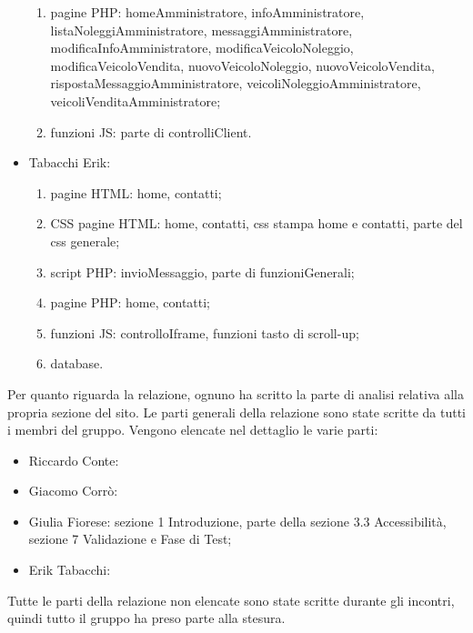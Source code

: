 \begin{itemize}
\begin{enumerate}
            \item pagine PHP: homeAmministratore, infoAmministratore, listaNoleggiAmministratore, messaggiAmministratore, modificaInfoAmministratore, modificaVeicoloNoleggio, modificaVeicoloVendita, nuovoVeicoloNoleggio, nuovoVeicoloVendita, rispostaMessaggioAmministratore, veicoliNoleggioAmministratore, veicoliVenditaAmministratore;
            \item funzioni JS: parte di controlliClient.
        \end{enumerate}
    \item Tabacchi Erik:
        \begin{enumerate}
            \item pagine HTML: home, contatti;
            \item CSS pagine HTML: home, contatti, css stampa home e contatti, parte del css generale;
            \item script PHP: invioMessaggio, parte di funzioniGenerali;
            \item pagine PHP: home, contatti;
            \item funzioni JS: controlloIframe, funzioni tasto di scroll-up;
            \item database.
        \end{enumerate}
\end{itemize}
Per quanto riguarda la relazione, ognuno ha scritto la parte di analisi relativa alla propria sezione del sito. Le parti generali della relazione sono state scritte da tutti i membri del gruppo.
Vengono elencate nel dettaglio le varie parti:
\begin{itemize}
    \item Riccardo Conte: 
    \item Giacomo Corrò: 
    \item Giulia Fiorese: sezione 1 Introduzione, parte della sezione 3.3 Accessibilità, sezione 7 Validazione e Fase di Test; 
    \item Erik Tabacchi:
\end{itemize}
Tutte le parti della relazione non elencate sono state scritte durante gli incontri, quindi tutto il gruppo ha preso parte alla stesura.
\pagebreak
